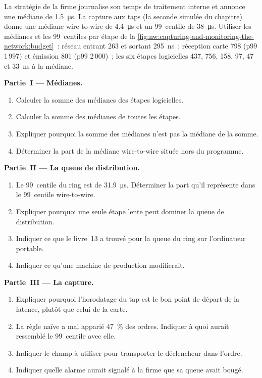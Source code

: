 \begin{problem}\label{pb:nw:capturing-and-monitoring-the-network:1}
La stratégie de la firme journalise son temps de traitement interne et annonce une médiane de \qty{1.5}{\micro\second}. La capture aux taps (la
seconde simulée du chapitre) donne une médiane wire-to-wire de \qty{4.4}{\micro\second} et un 99~centile de \qty{38}{\micro\second}. Utiliser les
médianes et les 99~centiles par étape de la \cref{fig:nw:capturing-and-monitoring-the-network:budget}~: réseau entrant 263 et sortant 295~ns~; réception carte 798
(p99 1\,997) et émission 801 (p99 2\,000)~; les six étapes logicielles 437, 756, 158, 97, 47 et 33~ns à la médiane.

\medskip\noindent\textbf{Partie~I --- Médianes.}
\begin{enumerate}
\item Calculer la somme des médianes des étapes logicielles.
\item Calculer la somme des médianes de toutes les étapes.
\item Expliquer pourquoi la somme des médianes n'est pas la médiane de la somme.
\item Déterminer la part de la médiane wire-to-wire située hors du programme.
\end{enumerate}

\medskip\noindent\textbf{Partie~II --- La queue de distribution.}
\begin{enumerate}[resume]
\item Le 99~centile du ring est de \qty{31.9}{\micro\second}. Déterminer la part qu'il représente dans le 99~centile wire-to-wire.
\item Expliquer pourquoi une seule étape lente peut dominer la queue de distribution.
\item Indiquer ce que le livre~13 a trouvé pour la queue du ring sur l'ordinateur portable.
\item Indiquer ce qu'une machine de production modifierait.
\end{enumerate}

\medskip\noindent\textbf{Partie~III --- La capture.}
\begin{enumerate}[resume]
\item Expliquer pourquoi l'horodatage du tap est le bon point de départ de la latence, plutôt que celui de la carte.
\item La règle naïve a mal apparié 47~\% des ordres. Indiquer à quoi aurait ressemblé le 99~centile avec elle.
\item Indiquer le champ à utiliser pour transporter le déclencheur dans l'ordre.
\item Indiquer quelle alarme aurait signalé à la firme que sa queue avait bougé.
\end{enumerate}


\end{problem}

